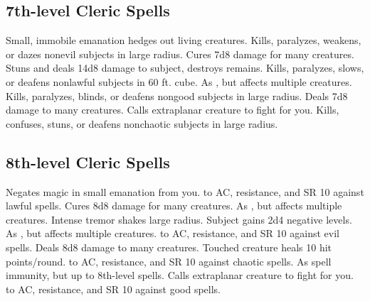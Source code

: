 \subsection{7th-level Cleric Spells}
\begin{spelllist}
   Small, immobile emanation hedges out living creatures.
   Kills, paralyzes, weakens, or dazes nonevil subjects in large radius.
   Cures 7d8 damage for many creatures.
  \F Stuns and deals 14d8 damage to subject, destroys remains.
   Kills, paralyzes, slows, or deafens nonlawful subjects in 60 ft. cube.
   As , but affects multiple creatures.
   Kills, paralyzes, blinds, or deafens nongood subjects in large radius.
   Deals 7d8 damage to many creatures.
   Calls extraplanar creature to fight for you.
   Kills, confuses, stuns, or deafens nonchaotic subjects in large radius.
\end{spelllist}

\subsection{8th-level Cleric Spells}
\begin{spelllist}
   Negates magic in small emanation from you.
  \F {} to AC,  resistance, and SR 10 against lawful spells.
   Cures 8d8 damage for many creatures.
   As , but affects multiple creatures.
   Intense tremor shakes large radius.
   Subject gains 2d4 negative levels.
   As , but affects multiple creatures.
  \F {} to AC,  resistance, and SR 10 against evil spells.
   Deals 8d8 damage to many creatures.
   Touched creature heals 10 hit points/round.
  \F {} to AC,  resistance, and SR 10 against chaotic spells.
   As spell immunity, but up to 8th-level spells.
   Calls extraplanar creature to fight for you.
  \F {} to AC,  resistance, and SR 10 against good spells.
\end{spelllist}

